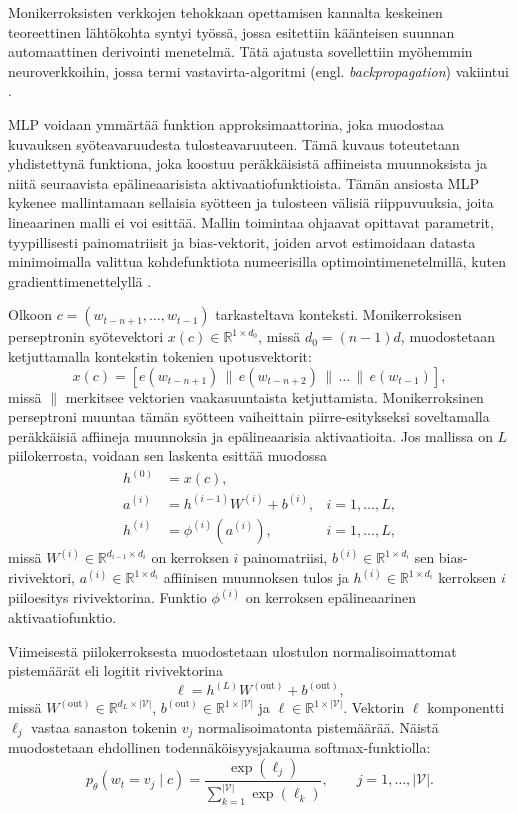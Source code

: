 Monikerroksisten verkkojen tehokkaan opettamisen kannalta keskeinen teoreettinen
lähtökohta syntyi työssä, jossa esitettiin käänteisen suunnan automaattinen derivointi menetelmä\cite{linnainmaa1970taylor}.
Tätä ajatusta sovellettiin myöhemmin neuroverkkoihin, jossa termi vastavirta-algoritmi (engl. \emph{backpropagation}) vakiintui \cite{werbos1974beyond, rumelhart1986learning}.

MLP voidaan ymmärtää funktion approksimaattorina, joka muodostaa
kuvauksen syöteavaruudesta tulosteavaruuteen. Tämä kuvaus toteutetaan
yhdistettynä funktiona, joka koostuu peräkkäisistä affiineista muunnoksista ja
niitä seuraavista epälineaarisista aktivaatiofunktioista. Tämän ansiosta MLP
kykenee mallintamaan sellaisia syötteen ja tulosteen välisiä riippuvuuksia,
joita lineaarinen malli ei voi esittää. Mallin toimintaa ohjaavat opittavat
parametrit, tyypillisesti painomatriisit ja bias-vektorit, joiden arvot
estimoidaan datasta minimoimalla valittua kohdefunktiota numeerisilla
optimointimenetelmillä, kuten gradienttimenettelyllä
\cite{goodfellow2016deep}.

Olkoon \(c = (w_{t-n+1}, \dots, w_{t-1})\) tarkasteltava konteksti. Monikerroksisen
perseptronin syötevektori \(x(c) \in \mathbb{R}^{1 \times d_0}\), missä
\(d_0 = (n-1)d\), muodostetaan ketjuttamalla kontekstin tokenien upotusvektorit:
$$
x(c) = [e(w_{t-n+1}) \,\|\, e(w_{t-n+2}) \,\|\, \dots \,\|\, e(w_{t-1})],
$$
missä \(\|\) merkitsee vektorien vaakasuuntaista ketjuttamista. Monikerroksinen
perseptroni muuntaa tämän syötteen vaiheittain piirre-esitykseksi soveltamalla
peräkkäisiä affiineja muunnoksia ja epälineaarisia aktivaatioita. Jos mallissa on
\(L\) piilokerrosta, voidaan sen laskenta esittää muodossa
\begin{align*}
  h^{(0)} &= x(c),\\
  a^{(i)} &= h^{(i-1)} W^{(i)} + b^{(i)},
  & i = 1,\dots,L, \\
  h^{(i)} &= \phi^{(i)}\!\left(a^{(i)}\right),
  & i = 1,\dots,L,
\end{align*}
missä \(W^{(i)}\in\mathbb{R}^{d_{i-1}\times d_i}\) on kerroksen
\(i\) painomatriisi, \(b^{(i)}\in\mathbb{R}^{1\times d_i}\) sen bias-rivivektori,
\(a^{(i)}\in\mathbb{R}^{1\times d_i}\) affiinisen muunnoksen tulos ja
\(h^{(i)}\in\mathbb{R}^{1\times d_i}\) kerroksen \(i\) piiloesitys rivivektorina.
Funktio \(\phi^{(i)}\) on kerroksen epälineaarinen aktivaatiofunktio.

Viimeisestä piilokerroksesta muodostetaan ulostulon
normalisoimattomat pistemäärät eli logitit rivivektorina
$$
\ell = h^{(L)} W^{(\mathrm{out})} + b^{(\mathrm{out})},
$$
missä \(W^{(\mathrm{out})}\in\mathbb{R}^{d_L\times |\mathcal{V}|}\),
\(b^{(\mathrm{out})}\in\mathbb{R}^{1\times |\mathcal{V}|}\) ja \(\ell\in\mathbb{R}^{1\times |\mathcal{V}|}\).
Vektorin \(\ell\) komponentti \(\ell_j\) vastaa sanaston tokenin \(v_j\)
normalisoimatonta pistemäärää. Näistä muodostetaan ehdollinen
todennäköisyysjakauma softmax-funktiolla:
$$
p_\theta(w_t = v_j \mid c)
=
\frac{\exp(\ell_j)}{\sum_{k=1}^{|\mathcal{V}|}\exp(\ell_k)},
\qquad j=1,\dots,|\mathcal{V}|.
$$

